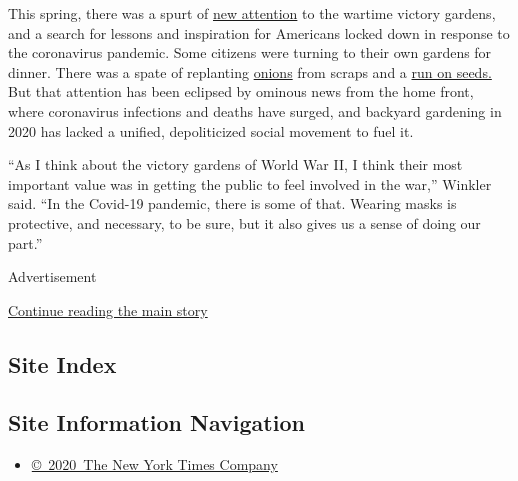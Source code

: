 This spring, there was a spurt of
\href{https://www.nytimes.com/2020/04/15/magazine/gardening-quarantine-coronavirus.html}{new
attention} to the wartime victory gardens, and a search for lessons and
inspiration for Americans locked down in response to the coronavirus
pandemic. Some citizens were turning to their own gardens for dinner.
There was a spate of replanting
\href{https://www.eater.com/2020/4/16/21224012/quarantine-trend-growing-scallions-vegetables-jars-water-kitchen-scraps}{onions}
from scraps and a
\href{https://www.reuters.com/article/us-health-coronavirus-gardens/home-gardening-blooms-around-the-world-during-coronavirus-lockdowns-idUSKBN2220D3}{run
on seeds.} But that attention has been eclipsed by ominous news from the
home front, where coronavirus infections and deaths have surged, and
backyard gardening in 2020 has lacked a unified, depoliticized social
movement to fuel it.

``As I think about the victory gardens of World War II, I think their
most important value was in getting the public to feel involved in the
war,'' Winkler said. ``In the Covid-19 pandemic, there is some of that.
Wearing masks is protective, and necessary, to be sure, but it also
gives us a sense of doing our part.''

Advertisement

\protect\hyperlink{after-bottom}{Continue reading the main story}

\hypertarget{site-index}{%
\subsection{Site Index}\label{site-index}}

\hypertarget{site-information-navigation}{%
\subsection{Site Information
Navigation}\label{site-information-navigation}}

\begin{itemize}
\tightlist
\item
  \href{https://help.nytimes.com/hc/en-us/articles/115014792127-Copyright-notice}{©~2020~The
  New York Times Company}
\end{itemize}

